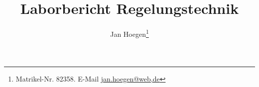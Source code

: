 

\hypersetup{
    colorlinks=true,
    bookmarksnumbered=true,
}


\flushbottom                                        %



        
\newcommand{\missing}{%
    \textcolor{coloryellow}{MISSING}%
    \PackageWarning{rtl_labor}{You used the 'missing' macro at this line. Remove it before finalising document}%
}
\newcommand{\improve}{%
    \textcolor{coloryellow}{IMPROVE}%
    \PackageWarning{rtl_labor}{You used the 'improve' macro at this line. Remove it before finalising document}%
}

\newcommand{\legend}[1]{\par\footnotesize\textbf{Legende}: #1\par}
\newcommand{\figsource}[1]{\par\footnotesize\textbf{Quelle:} #1\par}


\titlehead{%
    Hochschule Karlsruhe\\
    University of Applied Sciences\\
    Fakultät für Elektro- und Informationstechnik
}
\title{Laborbericht Regelungstechnik}

\publishers{Betreuer: Prof. Dr. Keller}

\author{%
    Jan Hoegen\thanks{%
        Matrikel-Nr. 82358. E-Mail \href{jan.hoegen@web,de}{jan.hoegen@web,de}}%
}


